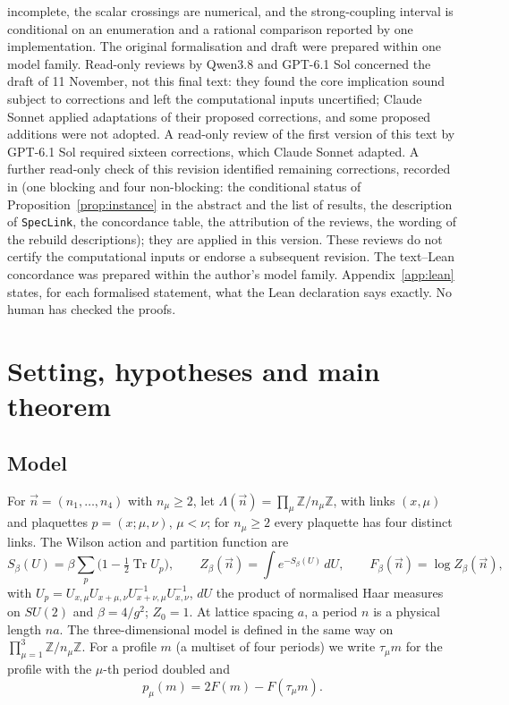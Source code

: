 \documentclass[11pt,a4paper]{article}
\theoremstyle{plain}
\theoremstyle{definition}
\theoremstyle{remark}
\numberwithin{equation}{section}
\newcommand{\Z}{\mathbb{Z}}
\newcommand{\Tr}{\operatorname{Tr}}
\begin{document}
incomplete, the scalar crossings are numerical, and the strong-coupling interval is conditional on an enumeration and a rational comparison reported by one implementation. The original formalisation and draft were prepared within one model family. Read-only reviews by Qwen3.8 and GPT-6.1 Sol concerned the draft of 11 November, not this final text: they found the core implication sound subject to corrections and left the computational inputs uncertified; Claude Sonnet applied adaptations of their proposed corrections, and some proposed additions were not adopted. A read-only review of the first version of this text by GPT-6.1 Sol required sixteen corrections, which Claude Sonnet adapted. A further read-only check of this revision identified remaining corrections, recorded in  (one blocking and four non-blocking: the conditional status of Proposition~\ref{prop:instance} in the abstract and the list of results, the description of \texttt{SpecLink}, the concordance table, the attribution of the reviews, the wording of the rebuild descriptions); they are applied in this version. These reviews do not certify the computational inputs or endorse a subsequent revision. The text--Lean concordance was prepared within the author's model family. Appendix~\ref{app:lean} states, for each formalised statement, what the Lean declaration says exactly. No human has checked the proofs.

\section{Setting, hypotheses and main theorem}\label{sec:setting}

\subsection{Model}
For $\vec n=(n_1,\dots,n_4)$ with $n_\mu\ge2$, let $\Lambda(\vec n)=\prod_\mu\Z/n_\mu\Z$, with links $(x,\mu)$ and plaquettes
$p=(x;\mu,\nu)$, $\mu<\nu$; for $n_\mu\ge2$ every plaquette has four distinct links. The Wilson action and partition function are
\begin{equation}\label{eq:wilson}
S_\beta(U)=\beta\sum_p\bigl(1-\tfrac12\Tr U_p\bigr),\qquad Z_\beta(\vec n)=\int e^{-S_\beta(U)}\,dU,\qquad F_\beta(\vec n)=\log Z_\beta(\vec n),
\end{equation}
with $U_p=U_{x,\mu}U_{x+\mu,\nu}U_{x+\nu,\mu}^{-1}U_{x,\nu}^{-1}$, $dU$ the product of normalised Haar measures on $SU(2)$ and
$\beta=4/g^2$; $Z_0=1$. At lattice spacing $a$, a period $n$ is a physical length $na$. The three-dimensional model is defined in the
same way on $\prod_{\mu=1}^3\Z/n_\mu\Z$. For a profile $m$ (a multiset of four periods) we write $\tau_\mu m$ for the profile with the
$\mu$-th period doubled and
\begin{equation}\label{eq:p}
p_\mu(m)=2F(m)-F(\tau_\mu m).
\end{equation}
\end{document}

